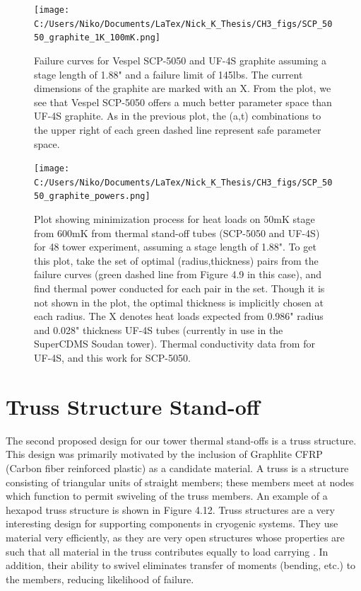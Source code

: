 \documentclass{report}
\begin{document}
\begin{figure}[h!]
\centering
\texttt{[image: C:/Users/Niko/Documents/LaTex/Nick\_K\_Thesis/CH3\_figs/SCP\_5050\_graphite\_1K\_100mK.png]}
\caption{Failure curves for Vespel SCP-5050 and UF-4S graphite assuming a stage length of 1.88" and a failure limit of 145lbs. The current dimensions of the graphite are marked with an X. From the plot, we see that Vespel SCP-5050 offers a much better parameter space than UF-4S graphite. As in the previous plot, the (a,t) combinations to the upper right of each green dashed line represent safe parameter space.}
\end{figure}
\begin{figure}[h!]
\centering
\texttt{[image: C:/Users/Niko/Documents/LaTex/Nick\_K\_Thesis/CH3\_figs/SCP\_5050\_graphite\_powers.png]}
\caption{Plot showing minimization process for heat loads on 50mK stage from 600mK from thermal stand-off tubes (SCP-5050 and UF-4S) for 48 tower experiment, assuming a stage length of 1.88". To get this plot, take the set of optimal (radius,thickness) pairs from the failure curves (green dashed line from Figure 4.9 in this case), and find thermal power conducted for each pair in the set. Though it is not shown in the plot, the optimal thickness is implicitly chosen at each radius. The X denotes heat loads expected from 0.986" radius and 0.028" thickness UF-4S tubes (currently in use in the SuperCDMS Soudan tower). Thermal conductivity data from \cite{lem} for UF-4S, and this work for SCP-5050.}
\end{figure}

\section{Truss Structure Stand-off}

The second proposed design for our tower thermal stand-offs is a truss structure. This design was primarily motivated by the inclusion of Graphlite CFRP (Carbon fiber reinforced plastic) as a candidate material. A truss is a structure consisting of triangular units of straight members; these members meet at nodes which function to permit swiveling of the truss members. An example of a hexapod truss structure is shown in Figure 4.12. Truss structures are a very interesting design for supporting components in cryogenic systems. They use material very efficiently, as they are very open structures whose properties are such that all material in the truss contributes equally to load carrying \cite{Hastings1993}. In addition, their ability to swivel eliminates transfer of moments (bending, etc.) to the members, reducing likelihood of failure.
\end{document}
